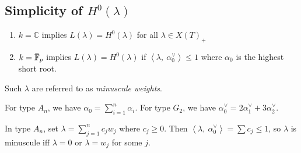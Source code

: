 \hypertarget{simplicity-of-h0lambda}{%
\subsection{\texorpdfstring{Simplicity of
\(H^0(\lambda)\)}{Simplicity of H\^{}0(\textbackslash lambda)}}\label{simplicity-of-h0lambda}}

\begin{enumerate}
\def\labelenumi{\arabic{enumi}.}
\item
  \(k = {\mathbb{C}}\) implies \(L(\lambda) = H^0(\lambda)\) for all
  \(\lambda \in X(T)_+\)
\item
  \(k= \mkern 1.5mu\overline{\mkern-1.5mu{\mathbb{F}}\mkern-1.5mu}\mkern 1.5mu_p\)
  implies \(L(\lambda) = H^0(\lambda)\) if
  \({\left\langle {\lambda},~{\alpha_0^\vee} \right\rangle} \leq 1\)
  where \(\alpha_0\) is the highest short root.
\end{enumerate}

Such \(\lambda\) are referred to as \emph{minuscule weights}.

\begin{example}

\begin{example}

For type \(A_n\), we have \(\alpha_0 = \sum_{i=1}^n \alpha_i\). For type
\(G_2\), we have \(\alpha_0^\vee= 2\alpha_1^\vee+ 3\alpha_2^\vee\).

\end{example}

\end{example}

\begin{example}

\begin{example}

In type \(A_n\), set \(\lambda = \sum_{j=1}^n c_j w_j\) where
\(c_j \geq 0\). Then
\({\left\langle {\lambda},~{\alpha_0^\vee} \right\rangle} = \sum c_j \leq 1\),
so \(\lambda\) is minuscule iff \(\lambda = 0\) or \(\lambda = w_j\) for
some \(j\).

\end{example}

\end{example}

